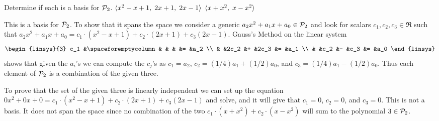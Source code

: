 
\begin{Exercise}[
name={},
title={}, 
difficulty=0,
origin={\cite{JH}}]
Determine if each is a basis for $\mathcal{P}_2$.
\Question $\langle x^2-x+1,\; 2x+1,\; 2x-1\rangle$
\Question $\langle x+x^2,\; x-x^2\rangle$
\end{Exercise}

\begin{Answer}
\Question This is a basis for $\mathcal{P}_2$.
           To show that it spans the space we consider a generic
           $a_2x^2+a_1x+a_0\in\mathcal{P}_2$ and look for 
           scalars $c_1, c_2, c_3\in\Re$ such that
           $a_2x^2+a_1x+a_0=c_1\cdot(x^2-x+1) +c_2\cdot(2x+1) +c_3(2x-1)$.
           Gauss's Method on the linear system
           \begin{equation*}
             \begin{linsys}{3}
               c_1  &\spaceforemptycolumn  &     &  &     &=  &a_2 \\
                    &  &2c_2 &+ &2c_3 &=  &a_1 \\
                    &  &c_2  &- &c_3   &=  &a_0
             \end{linsys}
           \end{equation*}
           shows that given the $a_i$'s we can compute the $c_j$'s as
           $c_1=a_2$, $c_2=(1/4)a_1+(1/2)a_0$, and $c_3=(1/4)a_1-(1/2)a_0$.
           Thus each element of $\mathcal{P}_2$ is a combination of the 
           given three.

           To prove that the set of the given three is linearly independent
           we can set up the equation 
           $0x^2+0x+0=c_1\cdot(x^2-x+1) +c_2\cdot(2x+1) +c_3(2x-1)$
           and solve, and it will give that $c_1=0$, $c_2=0$, and $c_3=0$.
\Question This is not a basis.
           It does not span the space since no combination of the two
           $c_1\cdot (x+x^2) +c_2\cdot (x-x^2)$ will sum to the polynomial 
           $3\in\mathcal{P}_2$.  
\end{Answer}
